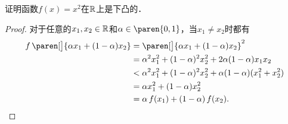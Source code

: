 \begin{example*}
  证明函数\(f(x) = x^2\)在\(\mathbb{R}\)上是下凸的．

  \begin{proof}
    对于任意的\(x_1, x_2 \in \mathbb{R}\)和\(\alpha \in \paren{0,1}\)，当\(x_1 \ne x_2\)时都有
    \[
      \begin{split}
        f\,\paren[\big]{\alpha x_1 + (1-\alpha) x_2}
        &= \paren[\big]{\alpha x_1 + (1-\alpha) x_2}^2 \\
        &= \alpha^2 x_1^2 + (1-\alpha)^2 x_2^2 + 2 \alpha (1-\alpha) x_1 x_2 \\
        &< \alpha^2 x_1^2 + (1-\alpha)^2 x_2^2 + \alpha (1-\alpha) (x_1^2 + x_2^2) \\
        &= \alpha x_1^2 + (1-\alpha) x_2^2 \\
        &= \alpha\,f(x_1) + (1-\alpha)\,f(x_2). \qedhere
      \end{split}
    \]
  \end{proof}
\end{example*}


